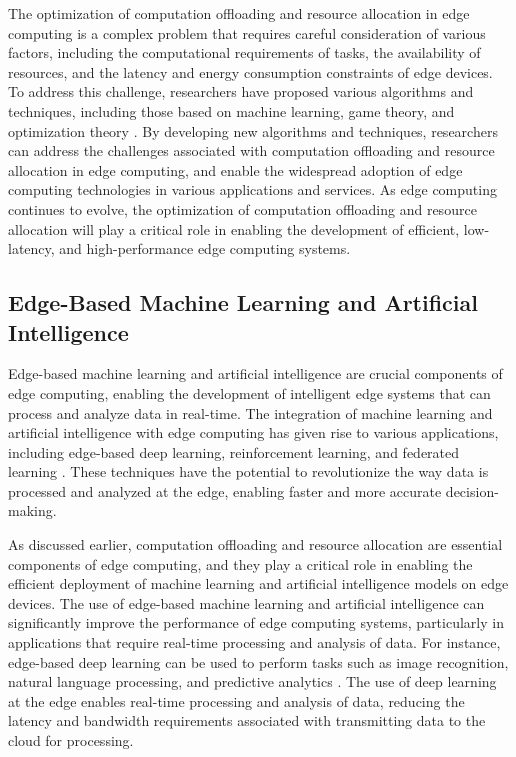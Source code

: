 \documentclass[11pt]{article}
\begin{document}
The optimization of computation offloading and resource allocation in edge computing is a complex problem that requires careful consideration of various factors, including the computational requirements of tasks, the availability of resources, and the latency and energy consumption constraints of edge devices. To address this challenge, researchers have proposed various algorithms and techniques, including those based on machine learning, game theory, and optimization theory \cite{ref74}. By developing new algorithms and techniques, researchers can address the challenges associated with computation offloading and resource allocation in edge computing, and enable the widespread adoption of edge computing technologies in various applications and services. As edge computing continues to evolve, the optimization of computation offloading and resource allocation will play a critical role in enabling the development of efficient, low-latency, and high-performance edge computing systems.

\subsection{Edge-Based Machine Learning and Artificial Intelligence}

Edge-based machine learning and artificial intelligence are crucial components of edge computing, enabling the development of intelligent edge systems that can process and analyze data in real-time. The integration of machine learning and artificial intelligence with edge computing has given rise to various applications, including edge-based deep learning, reinforcement learning, and federated learning \cite{ref75}. These techniques have the potential to revolutionize the way data is processed and analyzed at the edge, enabling faster and more accurate decision-making.

As discussed earlier, computation offloading and resource allocation are essential components of edge computing, and they play a critical role in enabling the efficient deployment of machine learning and artificial intelligence models on edge devices. The use of edge-based machine learning and artificial intelligence can significantly improve the performance of edge computing systems, particularly in applications that require real-time processing and analysis of data. For instance, edge-based deep learning can be used to perform tasks such as image recognition, natural language processing, and predictive analytics \cite{ref7}. The use of deep learning at the edge enables real-time processing and analysis of data, reducing the latency and bandwidth requirements associated with transmitting data to the cloud for processing.
\end{document}
